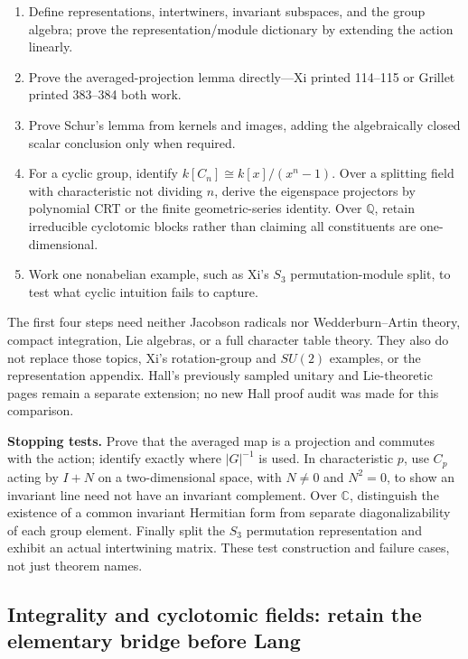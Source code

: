 \documentclass[
  11pt,
]{article}
\providecommand{\tightlist}{%
  \setlength{\itemsep}{0pt}\setlength{\parskip}{0pt}}
\begin{document}
\begin{enumerate}
\def\labelenumi{\arabic{enumi}.}
\tightlist
\item
  Define representations, intertwiners, invariant subspaces, and the
  group algebra; prove the representation/module dictionary by extending
  the action linearly.
\item
  Prove the averaged-projection lemma directly---Xi printed 114--115 or
  Grillet printed 383--384 both work.
\item
  Prove Schur's lemma from kernels and images, adding the algebraically
  closed scalar conclusion only when required.
\item
  For a cyclic group, identify \(k[C_n]\cong k[x]/(x^n-1)\). Over a
  splitting field with characteristic not dividing \(n\), derive the
  eigenspace projectors by polynomial CRT or the finite geometric-series
  identity. Over \(\mathbb Q\), retain irreducible cyclotomic blocks
  rather than claiming all constituents are one-dimensional.
\item
  Work one nonabelian example, such as Xi's \(S_3\) permutation-module
  split, to test what cyclic intuition fails to capture.
\end{enumerate}

The first four steps need neither Jacobson radicals nor
Wedderburn--Artin theory, compact integration, Lie algebras, or a full
character table theory. They also do not replace those topics, Xi's
rotation-group and \(SU(2)\) examples, or the representation appendix.
Hall's previously sampled unitary and Lie-theoretic pages remain a
separate extension; no new Hall proof audit was made for this
comparison.

\textbf{Stopping tests.} Prove that the averaged map is a projection and
commutes with the action; identify exactly where \(|G|^{-1}\) is used.
In characteristic \(p\), use \(C_p\) acting by \(I+N\) on a
two-dimensional space, with \(N\neq0\) and \(N^2=0\), to show an
invariant line need not have an invariant complement. Over
\(\mathbb C\), distinguish the existence of a common invariant Hermitian
form from separate diagonalizability of each group element. Finally
split the \(S_3\) permutation representation and exhibit an actual
intertwining matrix. These test construction and failure cases, not just
theorem names.

\subsection{Integrality and cyclotomic fields: retain the elementary
bridge before
Lang}\label{integrality-and-cyclotomic-fields-retain-the-elementary-bridge-before-lang}
\end{document}
